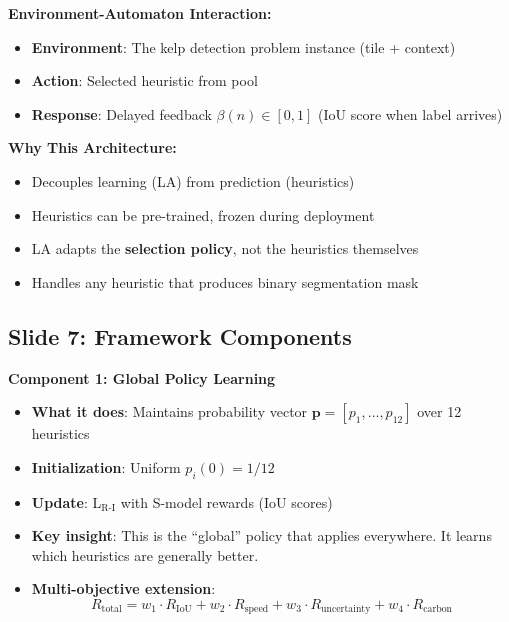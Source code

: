\documentclass[11pt]{article}
\begin{document}
\textbf{Environment-Automaton Interaction:}
\begin{itemize}
    \item \textbf{Environment}: The kelp detection problem instance (tile + context)
    \item \textbf{Action}: Selected heuristic from pool
    \item \textbf{Response}: Delayed feedback $\beta(n) \in [0,1]$ (IoU score when label arrives)
\end{itemize}

\textbf{Why This Architecture:}
\begin{itemize}
    \item Decouples learning (LA) from prediction (heuristics)
    \item Heuristics can be pre-trained, frozen during deployment
    \item LA adapts the \textbf{selection policy}, not the heuristics themselves
    \item Handles any heuristic that produces binary segmentation mask
\end{itemize}

\subsection{Slide 7: Framework Components}

\textbf{Component 1: Global Policy Learning}

\begin{itemize}
    \item \textbf{What it does}: Maintains probability vector $\mathbf{p} = [p_1, \ldots, p_{12}]$ over 12 heuristics
    \item \textbf{Initialization}: Uniform $p_i(0) = 1/12$
    \item \textbf{Update}: L$_{\text{R-I}}$ with S-model rewards (IoU scores)
    \item \textbf{Key insight}: This is the ``global'' policy that applies everywhere. It learns which heuristics are generally better.
    \item \textbf{Multi-objective extension}:
    \[
    R_{\text{total}} = w_1 \cdot R_{\text{IoU}} + w_2 \cdot R_{\text{speed}} + w_3 \cdot R_{\text{uncertainty}} + w_4 \cdot R_{\text{carbon}}
    \]
\end{itemize}
\end{document}

